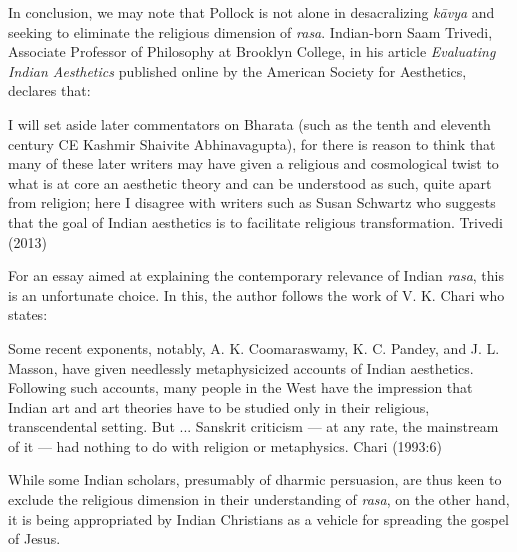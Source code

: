 In conclusion, we may note that Pollock is not alone in desacralizing \textsl{kāvya} and seeking to eliminate the religious dimension of \textsl{rasa}. Indian-born Saam Trivedi, Associate Professor of Philosophy at Brooklyn College, in his article \textsl{Evaluating Indian Aesthetics} published online by the American Society for Aesthetics, declares that:

\vskip 4pt

\begin{myquote}
I will set aside later commentators on Bharata (such as the tenth and eleventh century CE Kashmir Shaivite Abhinavagupta), for there is reason to think that many of these later writers may have given a religious and cosmological twist to what is at core an aesthetic theory and can be understood as such, quite apart from religion; here I disagree with writers such as Susan Schwartz who suggests that the goal of Indian aesthetics is to facilitate religious transformation. 
\hfill Trivedi (2013)
\end{myquote}

For an essay aimed at explaining the contemporary relevance of Indian \textsl{rasa}, this is an unfortunate choice. In this, the author follows the work of V. K. Chari who states:

\vskip 4pt

\begin{myquote}
Some recent exponents, notably, A. K. Coomaraswamy, K. C. Pandey, and J. L. Masson, have given needlessly metaphysicized accounts of Indian aesthetics. Following such accounts, many people in the West have the impression that Indian art and art theories have to be studied only in their religious, transcendental setting. But ... Sanskrit criticism --- at any rate, the mainstream of it --- had nothing to do with religion or metaphysics. 
\hfill Chari (1993:6)
\end{myquote}

While some Indian scholars, presumably of dharmic persuasion, are thus keen to exclude the religious dimension in their understanding of \textsl{rasa}, on the other hand, it is being appropriated by Indian Christians as a vehicle for spreading the gospel of Jesus. 

